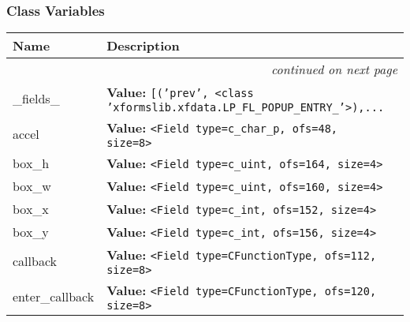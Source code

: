 
  \subsubsection{Class Variables}

    \vspace{-1cm}
\hspace{\varindent}\begin{longtable}{|p{\varnamewidth}|p{\vardescrwidth}|l}
\cline{1-2}
\cline{1-2} \centering \textbf{Name} & \centering \textbf{Description}& \\
\cline{1-2}
\endhead\cline{1-2}\multicolumn{3}{r}{\small\textit{continued on next page}}\\\endfoot\cline{1-2}
\endlastfoot\raggedright \_\-f\-i\-e\-l\-d\-s\-\_\- & \raggedright \textbf{Value:} 
{\tt \texttt{[}\texttt{(}\texttt{'}\texttt{prev}\texttt{'}\texttt{, }{\textless}class 'xformslib.xfdata.LP\_FL\_POPUP\_ENTRY\_'{\textgreater}\texttt{)}\texttt{,}\texttt{...}}&\\
\cline{1-2}
\raggedright a\-c\-c\-e\-l\- & \raggedright \textbf{Value:} 
{\tt {\textless}Field type=c\_char\_p, ofs=48, size=8{\textgreater}}&\\
\cline{1-2}
\raggedright b\-o\-x\-\_\-h\- & \raggedright \textbf{Value:} 
{\tt {\textless}Field type=c\_uint, ofs=164, size=4{\textgreater}}&\\
\cline{1-2}
\raggedright b\-o\-x\-\_\-w\- & \raggedright \textbf{Value:} 
{\tt {\textless}Field type=c\_uint, ofs=160, size=4{\textgreater}}&\\
\cline{1-2}
\raggedright b\-o\-x\-\_\-x\- & \raggedright \textbf{Value:} 
{\tt {\textless}Field type=c\_int, ofs=152, size=4{\textgreater}}&\\
\cline{1-2}
\raggedright b\-o\-x\-\_\-y\- & \raggedright \textbf{Value:} 
{\tt {\textless}Field type=c\_int, ofs=156, size=4{\textgreater}}&\\
\cline{1-2}
\raggedright c\-a\-l\-l\-b\-a\-c\-k\- & \raggedright \textbf{Value:} 
{\tt {\textless}Field type=CFunctionType, ofs=112, size=8{\textgreater}}&\\
\cline{1-2}
\raggedright e\-n\-t\-e\-r\-\_\-c\-a\-l\-l\-b\-a\-c\-k\- & \raggedright \textbf{Value:} 
{\tt {\textless}Field type=CFunctionType, ofs=120, size=8{\textgreater}}&\\

\end{longtable}
